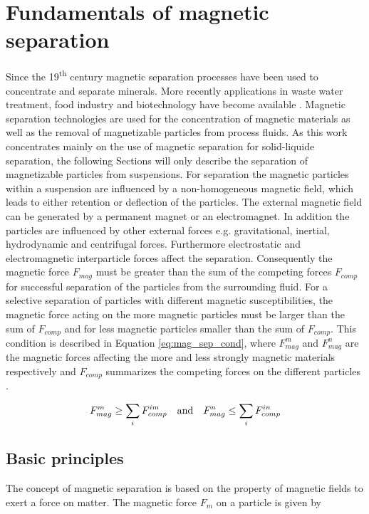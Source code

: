 \section{Fundamentals of magnetic separation}
\label{sec:Mag_sep}
Since the 19\textsuperscript{th} century magnetic separation processes have been used to concentrate and separate minerals. More recently applications in waste water treatment, food industry and biotechnology have become available \cite{yavuz2009magnetic}. Magnetic separation technologies are used for the concentration of magnetic materials  as well as the removal of magnetizable particles from process fluids. As this work concentrates mainly on the use of magnetic separation for solid-liquide separation, the following Sections will only describe the separation of magnetizable particles from suspensions. For separation the magnetic particles within a suspension are influenced by a non-homogeneous magnetic field, which leads to either retention or deflection of the particles. The external magnetic field can be generated by a permanent magnet or an electromagnet. In addition the particles are influenced by other external forces e.g. gravitational, inertial, hydrodynamic and centrifugal forces. Furthermore electrostatic and electromagnetic interparticle forces affect the separation. Consequently the magnetic force $F_{mag}$ must be greater than the sum of the competing forces $F_{comp}$ for successful separation of the particles from the surrounding fluid. For a selective separation of particles with different magnetic susceptibilities, the magnetic force acting on the more magnetic particles must be larger than the sum of $F_{comp}$ and for less magnetic particles smaller than the sum of $F_{comp}$. This condition is described in Equation \ref{eq:mag_sep_cond}, where $F_{mag}^{m}$ and $F_{mag}^{n}$ are the magnetic forces affecting the more and less strongly magnetic materials respectively and $F_{comp}$ summarizes the competing forces on the different particles \cite{svoboda2004magnetic}\cite{oberteuffer1974magnetic}.   

\begin{equation}
\label{eq:mag_sep_cond}
\centering
F_{mag}^{m}\geq\sum_{i}F_{comp}^{im} \quad \textrm{and} \quad F_{mag}^{n}\leq\sum_{i}F_{comp}^{in}
\end{equation}

\subsection{Basic principles}
\label{subsec:bas_princ}
The concept of magnetic separation is based on the property of magnetic fields to exert a force on matter. The magnetic force $F_{m}$ on a particle is given by 

